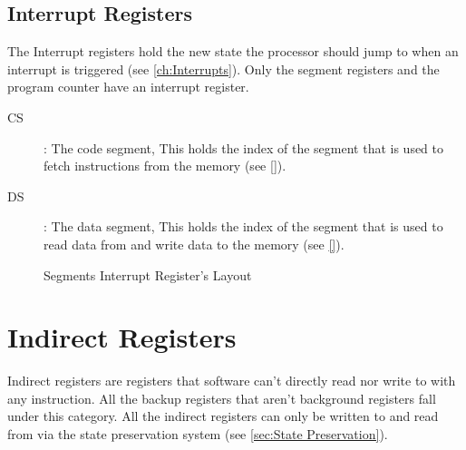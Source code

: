 \documentclass[oneside, a4paper]{memoir}
\begin{document}
\subsection{Interrupt Registers}
The Interrupt registers hold the new state the processor should jump to when an interrupt is triggered (see \autoref{ch:Interrupts}). Only the segment registers and the program counter have an interrupt register.
\begin{description}
\item[CS]: The code segment, This holds the index of the segment that is used to fetch instructions from the memory (see \autoref{}).
\item[DS]: The data segment, This holds the index of the segment that is used to read data from and write data to the memory (see \autoref{}).
\end{description}
\begin{figure}[h!]
\begin{center}
\caption{Segments Interrupt Register's Layout}
\contourlength{1pt}
\end{center}
\end{figure}
\section{Indirect Registers}
Indirect registers are registers that software can't directly read nor write to with any instruction. All the backup registers that aren't background registers fall under this category. All the indirect registers can only be written to and read from via the state preservation system (see \autoref{sec:State Preservation}).
\end{document}
